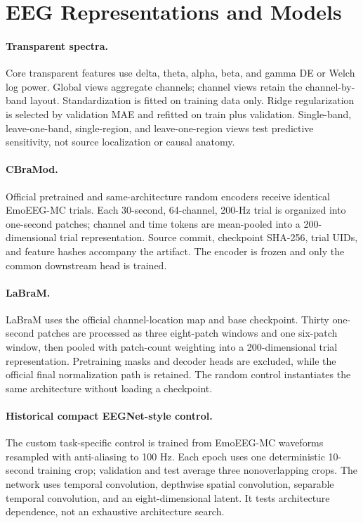 \section{EEG Representations and Models}
\label{app:models}

\paragraph{Transparent spectra.}
Core transparent features use delta, theta, alpha, beta, and gamma DE or Welch
log power. Global views aggregate channels; channel views retain the
channel-by-band layout. Standardization is fitted on training data only. Ridge
regularization is selected by validation MAE and refitted on train plus
validation. Single-band, leave-one-band, single-region, and leave-one-region
views test predictive sensitivity, not source localization or causal anatomy.

\paragraph{CBraMod.}
Official pretrained and same-architecture random encoders receive identical
EmoEEG-MC trials. Each 30-second, 64-channel, 200-Hz trial is organized into
one-second patches; channel and time tokens are mean-pooled into a 200-dimensional
trial representation. Source commit, checkpoint SHA-256, trial UIDs, and
feature hashes accompany the artifact. The encoder is frozen and only the
common downstream head is trained.

\paragraph{LaBraM.}
LaBraM uses the official channel-location map and base checkpoint. Thirty
one-second patches are processed as three eight-patch windows and one six-patch
window, then pooled with patch-count weighting into a 200-dimensional trial
representation. Pretraining masks and decoder heads are excluded, while the
official final normalization path is retained. The random control instantiates
the same architecture without loading a checkpoint.

\paragraph{Historical compact EEGNet-style control.}
The custom task-specific control is trained from EmoEEG-MC waveforms resampled with
anti-aliasing to 100 Hz. Each epoch uses one deterministic 10-second training
crop; validation and test average three nonoverlapping crops. The network uses
temporal convolution, depthwise spatial convolution, separable temporal
convolution, and an eight-dimensional latent. It tests architecture dependence,
not an exhaustive architecture search.

